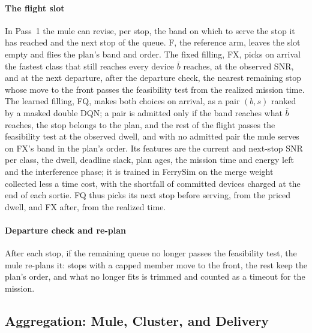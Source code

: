 \documentclass[conference]{IEEEtran}
\newcommand{\bbar}{\bar{b}}
\begin{document}
\paragraph{The flight slot}
In Pass~1 the mule can revise, per stop, the band on which to serve the stop it
has reached and the next stop of the queue. F, the reference arm, leaves the
slot empty and flies the plan's band and order. The fixed filling, FX, picks on
arrival the fastest class that still reaches every device $\bbar$ reaches, at the
observed SNR, and at the next departure, after the departure check, the nearest
remaining stop whose move to the front passes the feasibility test from the
realized mission time. The learned filling, FQ, makes both choices on arrival,
as a pair $(b,s)$ ranked by a masked double DQN; a pair is admitted only if the
band reaches what $\bbar$ reaches, the stop belongs to the plan, and the rest of
the flight passes the feasibility test at the observed dwell, and with no
admitted pair the mule serves on FX's band in the plan's order. Its features are
the current and next-stop SNR per class, the dwell, deadline slack, plan ages,
the mission time and energy left and the interference phase; it is trained in
FerrySim on the merge weight collected less a time cost, with the shortfall of
committed devices charged at the end of each sortie. FQ thus picks its next stop
before serving, from the priced dwell, and FX after, from the realized time.

\paragraph{Departure check and re-plan}
After each stop, if the remaining queue no longer passes the feasibility test,
the mule re-plans it: stops with a capped member move to the front, the rest
keep the plan's order, and what no longer fits is trimmed and counted as a
timeout for the mission.

\subsection{Aggregation: Mule, Cluster, and Delivery}
\label{sec:method:merge}
\end{document}
